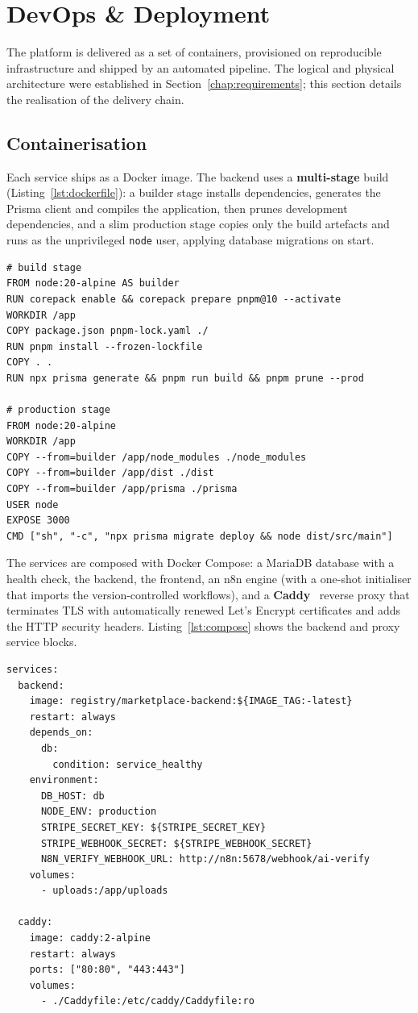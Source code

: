\section{DevOps \& Deployment}

The platform is delivered as a set of containers, provisioned on
reproducible infrastructure and shipped by an automated pipeline. The
logical and physical architecture were established in
Section~\ref{chap:requirements}; this section details the realisation of
the delivery chain.

\subsection{Containerisation}

Each service ships as a Docker image. The backend uses a
\textbf{multi-stage} build (Listing~\ref{lst:dockerfile}): a builder
stage installs dependencies, generates the Prisma client and compiles
the application, then prunes development dependencies, and a slim
production stage copies only the build artefacts and runs as the
unprivileged \texttt{node} user, applying database migrations on start.

\begin{lstlisting}[caption={Backend multi-stage Dockerfile (excerpt).},label={lst:dockerfile}]
# build stage
FROM node:20-alpine AS builder
RUN corepack enable && corepack prepare pnpm@10 --activate
WORKDIR /app
COPY package.json pnpm-lock.yaml ./
RUN pnpm install --frozen-lockfile
COPY . .
RUN npx prisma generate && pnpm run build && pnpm prune --prod

# production stage
FROM node:20-alpine
WORKDIR /app
COPY --from=builder /app/node_modules ./node_modules
COPY --from=builder /app/dist ./dist
COPY --from=builder /app/prisma ./prisma
USER node
EXPOSE 3000
CMD ["sh", "-c", "npx prisma migrate deploy && node dist/src/main"]
\end{lstlisting}

The services are composed with Docker Compose: a MariaDB database with a
health check, the backend, the frontend, an n8n engine (with a one-shot
initialiser that imports the version-controlled workflows), and a
\textbf{Caddy}~\cite{caddy} reverse proxy that terminates TLS with automatically
renewed Let's Encrypt certificates and adds the HTTP security headers.
Listing~\ref{lst:compose} shows the backend and proxy service blocks.

\begin{lstlisting}[caption={Docker Compose backend and reverse-proxy services (excerpt).},label={lst:compose}]
services:
  backend:
    image: registry/marketplace-backend:${IMAGE_TAG:-latest}
    restart: always
    depends_on:
      db:
        condition: service_healthy
    environment:
      DB_HOST: db
      NODE_ENV: production
      STRIPE_SECRET_KEY: ${STRIPE_SECRET_KEY}
      STRIPE_WEBHOOK_SECRET: ${STRIPE_WEBHOOK_SECRET}
      N8N_VERIFY_WEBHOOK_URL: http://n8n:5678/webhook/ai-verify
    volumes:
      - uploads:/app/uploads

  caddy:
    image: caddy:2-alpine
    restart: always
    ports: ["80:80", "443:443"]
    volumes:
      - ./Caddyfile:/etc/caddy/Caddyfile:ro
\end{lstlisting}

